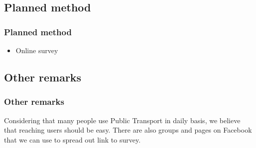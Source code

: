 \documentclass{beamer}
\begin{document}

\subsection{Planned method}

\begin{frame}
\frametitle{Planned method}

\begin{itemize}
\item Online survey
\end{itemize}

\end{frame}


\subsection{Other remarks}

\begin{frame}
\frametitle{Other remarks}

Considering that many people use Public Transport in daily basis, we believe that reaching users should be easy.
There are also groups and pages on Facebook that we can use to spread out link to survey.

\end{frame}

\end{document}

